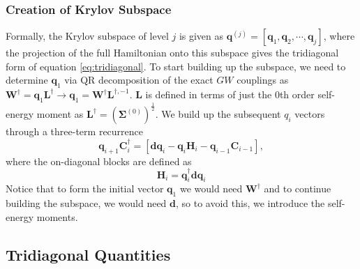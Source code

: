 \documentclass[12pt]{article} %
\begin{document}
\subsubsection{Creation of Krylov Subspace}
Formally, the Krylov subspace of level $j$ is given as $\mathbf{q}^{(j)}=\left[\mathbf{q}_1, \mathbf{q}_2, \cdots, \mathbf{q}_j\right]$, where the projection of the full Hamiltonian onto this subspace gives the tridiagonal form of equation \ref{eq:tridiagonal}. To start building up the subspace, we need to determine $\mathbf{q}_1$ via QR decomposition of the exact $GW$ couplings as $\mathbf{W}^\dag = \mathbf{q}_1 \mathbf{L}^\dag \rightarrow \mathbf{q}_1 = \mathbf{W}^\dag \mathbf{L}^{\dag, -1}$. $\mathbf{L}$ is defined in terms of just the 0th order self-energy moment as $\mathbf{L}^\dag = \left(\boldsymbol{\Sigma}^{(0)}\right)^{\frac{1}{2}}$. We build up the subsequent $q_i$ vectors through a three-term recurrence
\begin{equation}
    \mathbf{q}_{i+1} \mathbf{C}_i^{\dagger}=\left[\mathbf{d} \mathbf{q}_i-\mathbf{q}_{i} \mathbf{H}_i-\mathbf{q}_{i-1} \mathbf{C}_{i-1}\right],
\end{equation}
where the on-diagonal blocks are defined as
\begin{equation}
    \mathbf{H}_i=\mathbf{q}_i^{\dagger} \mathbf{d} \mathbf{q}_i
\end{equation}
Notice that to form the initial vector $\mathbf{q}_1$ we would need $\mathbf{W}^\dag$ and to continue building the subspace, we would need $\mathbf{d}$, so to avoid this, we introduce the self-energy moments.
\subsection{Tridiagonal Quantities}
\end{document}

